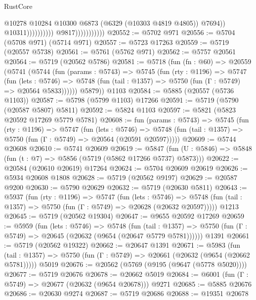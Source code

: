 \begin{lexlean}{RustCore}
\begin{coremodule}
                                                  @10278
                                                  @10284
                                                  @10300
                                                  @6873
                                                  (@6329 (@10303 @4819 @4805))
                                                  @7694))
                                              @10311))))))))))
                          @9817)))))))))))
@20552 := @5702 @971
@20556 := @5704 (@5708 @971) (@5714 @971)
@20557 := @5723 @17263
@20559 := @5719 (@20557 @5738)
@20561 := @5761 (@5762 @971)
@20562 := @5757 @20561
@20564 := @5719 (@20562 @5786)
@20581 := @5718
    (fun (fn : @60) =>
    @20559
      (@5741
        (@5744
          (fun (params : @5743) =>
          @5745
            (fun (rty : @1196) =>
            @5747
              (fun (lets : @5746) =>
              @5748 (fun (tail : @1357) => @5750 (fun (Γ : @5749) => @20564 @5833))))))
        @5879))
    @1103
@20584 := @5885 (@20557 (@5736 @1103))
@20587 := @5798 (@5799 @1103) @17266
@20591 := @5719 (@5790 (@20587 @5807) @5811)
@20592 := @5824 @1103
@20597 := @5821 (@5823 @20592 @17269 @5779 @5781)
@20608 := fun (params : @5743) =>
  @5745
    (fun (rty : @1196) =>
    @5747
      (fun (lets : @5746) =>
      @5748 (fun (tail : @1357) => @5750 (fun (Γ : @5749) => @20564 (@20591 @20597)))))
@20609 := @5744 @20608
@20610 := @5741 @20609
@20619 := @5847
    (fun (U : @5846) => @5848 (fun (t : @7) => @5856 (@5719 (@5862 @17266 @5737) @5873)))
@20622 := @20584 (@20610 @20619) @17264
@20624 := @5704 @20609 @20619
@20626 := @5934 @20608 @1808
@20628 := @5719 (@20562 @9197)
@20629 := @20587 @9200
@20630 := @5790 @20629
@20632 := @5719 (@20630 @5811)
@20643 := @5937
    (fun (rty : @1196) =>
    @5747
      (fun (lets : @5746) =>
      @5748 (fun (tail : @1357) => @5750 (fun (Γ : @5749) => @20628 (@20632 @20597)))))
    @1213
@20645 := @5719 (@20562 @19304)
@20647 := @9655 @20592 @17269
@20659 := @5959
    (fun (lets : @5746) =>
    @5748
      (fun (tail : @1357) =>
      @5750 (fun (Γ : @5749) => @20645 (@20632 (@9654 (@20647 @5779 @5781))))))
    @1391
@20661 := @5719 (@20562 @19322)
@20662 := @20647 @1391
@20671 := @5983
    (fun (tail : @1357) => @5750 (fun (Γ : @5749) => @20661 (@20632 (@9654 (@20662 @5781)))))
    @5019
@20676 := @20562 (@5769 (@9195 (@9647 (@5778 @5020))))
@20677 := @5719 @20676
@20678 := @20662 @5019
@20684 := @6001 (fun (Γ : @5749) => @20677 (@20632 (@9654 @20678))) @9271
@20685 := @5885 @20676
@20686 := @20630 @9274
@20687 := @5719 @20686
@20688 := @19351 @20678

\end{coremodule}
\end{lexlean}
